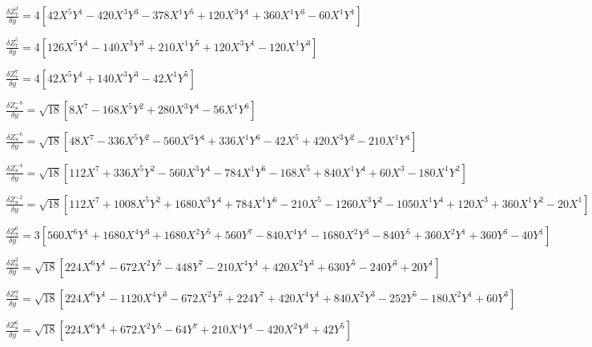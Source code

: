 \documentclass[10pt,landscape]{article}
\begin{document}
\vspace{1.2 mm}
\noindent $ \frac{\delta Z^{3}_{7}}{\delta y} = 4 [42X^{5}Y^{1} -420X^{3}Y^{3} -378X^{1}Y^{5} +120X^{3}Y^{1} +360X^{1}Y^{3} -60X^{1}Y^{1}] $

\vspace{1.2 mm}
\noindent $ \frac{\delta Z^{5}_{7}}{\delta y} = 4 [126X^{5}Y^{1} -140X^{3}Y^{3} +210X^{1}Y^{5} +120X^{3}Y^{1} -120X^{1}Y^{3}] $

\vspace{1.2 mm}
\noindent $ \frac{\delta Z^{7}_{7}}{\delta y} = 4 [42X^{5}Y^{1} +140X^{3}Y^{3} -42X^{1}Y^{5}] $

\vspace{1.2 mm}
\noindent $ \frac{\delta Z^{-8}_{8}}{\delta y} = \sqrt{18} [8X^{7} -168X^{5}Y^{2} +280X^{3}Y^{4} -56X^{1}Y^{6}] $

\vspace{1.2 mm}
\noindent $ \frac{\delta Z^{-6}_{8}}{\delta y} = \sqrt{18} [48X^{7} -336X^{5}Y^{2} -560X^{3}Y^{4} +336X^{1}Y^{6} -42X^{5} +420X^{3}Y^{2} -210X^{1}Y^{4}] $

\vspace{1.2 mm}
\noindent $ \frac{\delta Z^{-4}_{8}}{\delta y} = \sqrt{18} [112X^{7} +336X^{5}Y^{2} -560X^{3}Y^{4} -784X^{1}Y^{6} -168X^{5} +840X^{1}Y^{4} +60X^{3} -180X^{1}Y^{2}] $

\vspace{1.2 mm}
\noindent $ \frac{\delta Z^{-2}_{8}}{\delta y} = \sqrt{18} [112X^{7} +1008X^{5}Y^{2} +1680X^{3}Y^{4} +784X^{1}Y^{6} -210X^{5} -1260X^{3}Y^{2} -1050X^{1}Y^{4} +120X^{3} +360X^{1}Y^{2} -20X^{1}] $

\vspace{1.2 mm}
\noindent $ \frac{\delta Z^{0}_{8}}{\delta y} = 3 [560X^{6}Y^{1} +1680X^{4}Y^{3} +1680X^{2}Y^{5} +560Y^{7} -840X^{4}Y^{1} -1680X^{2}Y^{3} -840Y^{5} +360X^{2}Y^{1} +360Y^{3} -40Y^{1}] $

\vspace{1.2 mm}
\noindent $ \frac{\delta Z^{2}_{8}}{\delta y} = \sqrt{18} [224X^{6}Y^{1} -672X^{2}Y^{5} -448Y^{7} -210X^{4}Y^{1} +420X^{2}Y^{3} +630Y^{5} -240Y^{3} +20Y^{1}] $

\vspace{1.2 mm}
\noindent $ \frac{\delta Z^{4}_{8}}{\delta y} = \sqrt{18} [224X^{6}Y^{1} -1120X^{4}Y^{3} -672X^{2}Y^{5} +224Y^{7} +420X^{4}Y^{1} +840X^{2}Y^{3} -252Y^{5} -180X^{2}Y^{1} +60Y^{3}] $

\vspace{1.2 mm}
\noindent $ \frac{\delta Z^{6}_{8}}{\delta y} = \sqrt{18} [224X^{6}Y^{1} +672X^{2}Y^{5} -64Y^{7} +210X^{4}Y^{1} -420X^{2}Y^{3} +42Y^{5}] $
\end{document}
